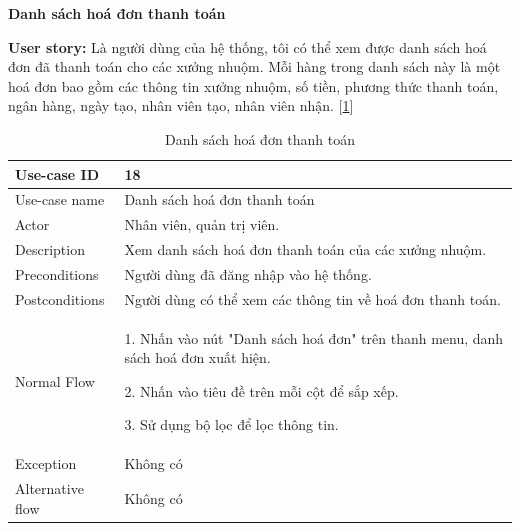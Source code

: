 \newpage
\textbf{Danh sách hoá đơn thanh toán}\par
\textbf{User story:} Là người dùng của hệ thống, tôi có thể xem được danh sách hoá đơn đã thanh toán cho các xưởng nhuộm. Mỗi hàng trong danh sách này là một hoá đơn bao gồm các thông tin xưởng nhuộm, số tiền, phương thức thanh toán, ngân hàng, ngày tạo, nhân viên tạo, nhân viên nhận. [\ref{bang18}]
\begin{table}[!htp]
    \centering
    \begin{tabular}{|m{3cm}|m{10cm}|}
    \hline 
        Use-case ID & 18\\ \hline
        Use-case name & Danh sách hoá đơn thanh toán\\ \hline
        Actor & Nhân viên, quản trị viên.\\ \hline
        Description & Xem danh sách hoá đơn thanh toán của các xưởng nhuộm.\\ \hline
        Preconditions & Người dùng đã đăng nhập vào hệ thống.\\ \hline
        Postconditions & Người dùng có thể xem các thông tin về hoá đơn thanh toán.\\ \hline
        Normal Flow & 
        1. Nhấn vào nút "Danh sách hoá đơn" trên thanh menu, danh sách hoá đơn xuất hiện.\par
        2. Nhấn vào tiêu đề trên mỗi cột để sắp xếp.\par
        3. Sử dụng bộ lọc để lọc thông tin.
        \\ \hline
        Exception & Không có\\ \hline
        Alternative flow & Không có\\ 
    \hline 
    \end{tabular}
    \caption{Danh sách hoá đơn thanh toán}
    \label{bang18}
\end{table}

